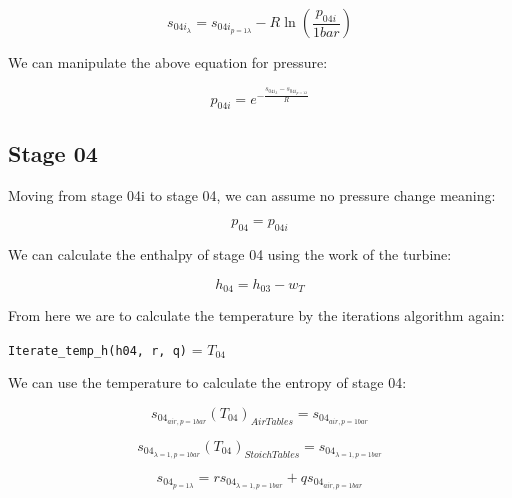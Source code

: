 \documentclass[titlepage]{article}
\begin{document}
    \begin{equation}
        s_{04i_{\lambda}} = s_{04i_{p=1 \lambda}} - R \ln \left( \frac{p_{04i}}{1 bar} \right)
    \end{equation}

    We can manipulate the above equation for pressure:

    \begin{equation}
        p_{04i} = e^{- \frac{s_{04i_{\lambda}} - s_{04i_{p=1 \lambda}}}{R}}
    \end{equation}

    \subsection{Stage 04}

    Moving from stage 04i to stage 04, we can assume no pressure change meaning:

    \begin{equation}
        p_{04} = p_{04i}
    \end{equation}

    We can calculate the enthalpy of stage 04 using the work of the turbine:

    \begin{equation}
        h_{04} = h_{03} - w_{T}
    \end{equation}

    From here we are to calculate the temperature by the iterations algorithm again:

    \begin{center}
        \verb|Iterate_temp_h(h04, r, q)| = $T_{04}$
    \end{center}

    We can use the temperature to calculate the entropy of stage 04:

    \begin{equation}
        s_{04_{air, p= 1 bar}}(T_{04})_{Air Tables} = s_{04_{air, p=1 bar}}
    \end{equation}

    \begin{equation}
        s_{04_{\lambda=1, p= 1 bar}}(T_{04})_{Stoich  Tables} = s_{04_{\lambda=1, p = 1 bar}}
    \end{equation}

    \begin{equation}
        s_{04_{p=1 \lambda}} = r s_{04_{\lambda=1, p=1 bar}} + q s_{04_{air, p=1 bar}}
    \end{equation}
\end{document}
